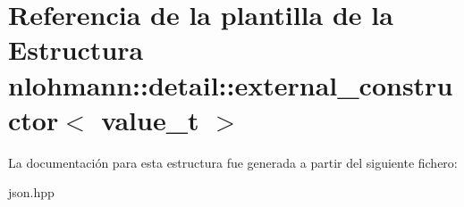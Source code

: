 \hypertarget{structnlohmann_1_1detail_1_1external__constructor}{}\section{Referencia de la plantilla de la Estructura nlohmann\+:\+:detail\+:\+:external\+\_\+constructor$<$ value\+\_\+t $>$}
\label{structnlohmann_1_1detail_1_1external__constructor}


La documentación para esta estructura fue generada a partir del siguiente fichero\+:\begin{DoxyCompactItemize}
\item 
json.\+hpp\end{DoxyCompactItemize}

